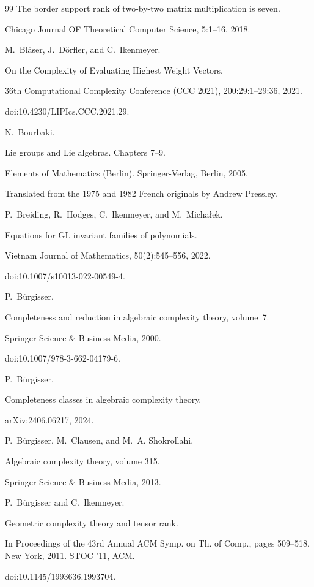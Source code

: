 \documentclass[10pt,a4paper]{article}
\begin{document}
\begin{thebibliography}{99}
The border support rank of two-by-two matrix multiplication is seven.


Chicago Journal OF Theoretical Computer Science, 5:1–16, 2018.

M. Bläser, J. Dörfler, and C. Ikenmeyer.


On the Complexity of Evaluating Highest Weight Vectors.


36th Computational Complexity Conference (CCC 2021),
200:29:1–29:36, 2021.


doi:10.4230/LIPIcs.CCC.2021.29.

N. Bourbaki.


Lie groups and Lie algebras. Chapters 7–9.


Elements of Mathematics (Berlin). Springer-Verlag, Berlin, 2005.


Translated from the 1975 and 1982 French originals by Andrew
Pressley.

P. Breiding, R. Hodges, C. Ikenmeyer, and M. Michałek.


Equations for GL invariant families of polynomials.


Vietnam Journal of Mathematics, 50(2):545–556, 2022.


doi:10.1007/s10013-022-00549-4.

P. Bürgisser.


Completeness and reduction in algebraic complexity theory,
volume 7.


Springer Science \& Business Media, 2000.


doi:10.1007/978-3-662-04179-6.

P. Bürgisser.


Completeness classes in algebraic complexity theory.


arXiv:2406.06217, 2024.

P. Bürgisser, M. Clausen, and M. A. Shokrollahi.


Algebraic complexity theory, volume 315.


Springer Science \& Business Media, 2013.

P. Bürgisser and C. Ikenmeyer.


Geometric complexity theory and tensor rank.


In Proceedings of the 43rd Annual ACM Symp. on Th. of Comp.,
pages 509–518, New York, 2011. STOC ’11, ACM.


doi:10.1145/1993636.1993704.


\end{thebibliography}
\end{document}
